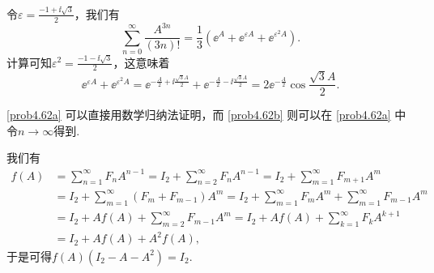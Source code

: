 \begin{solution}
  令$\varepsilon=\frac{-1+\ii\sqrt3}2$，我们有
  \[
    \sum_{n=0}^\infty \frac{A^{3n}}{(3n)!} = \frac13\left(\ee^A + \ee^{\varepsilon A} + \ee^{\varepsilon^2A}\right).
  \]
  计算可知$\varepsilon^2=\frac{-1-\ii\sqrt3}2$，这意味着
  \[
    \ee^{\varepsilon A} + \ee^{\varepsilon^2A} = \ee^{-\frac A2+\ii\frac{\sqrt3A}2} + \ee^{-\frac A2-\ii\frac{\sqrt3A}2} = 2\ee^{-\frac A2}\cos\frac{\sqrt3A}2.
  \]
\end{solution}

\begin{solution}
  \ref{prob4.62a} 可以直接用数学归纳法证明，而 \ref{prob4.62b} 则可以在 \ref{prob4.62a} 中令$n\to\infty$得到.
\end{solution}

\begin{solution}
  我们有
  \begin{align*}
    f(A) & = \sum_{n=1}^\infty F_nA^{n-1} = I_2 + \sum_{n=2}^\infty F_nA^{n-1} = I_2 + \sum_{m=1}^\infty F_{m+1}A^m \\
    & = I_2 + \sum_{m=1}^\infty (F_m + F_{m-1})A^m = I_2 + \sum_{m=1}^\infty F_mA^m + \sum_{m=1}^\infty F_{m-1}A^m \\
    & = I_2 + Af(A) + \sum_{m=2}^\infty F_{m-1}A^m = I_2 + Af(A) + \sum_{k=1}^\infty F_kA^{k+1} \\
    & = I_2 + Af(A) + A^2f(A),
  \end{align*}
  于是可得$f(A)(I_2-A-A^2)=I_2$.
\end{solution}

